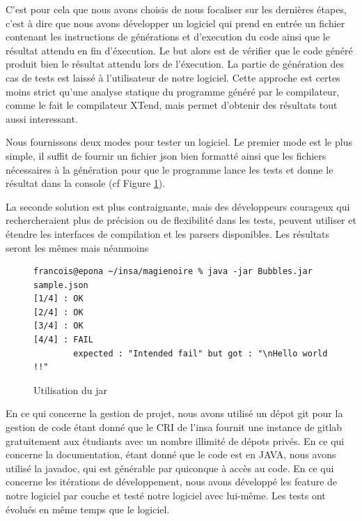 C'est pour cela que nous avons choisis de nous focaliser sur les dernières étapes, c'est à dire que
nous avons développer un logiciel qui prend en entrée un fichier contenant les instructions de générations et d'execution du code ainsi que le résultat
attendu en fin d'éxecution. Le but alors est de vérifier que le code généré produit bien le résultat attendu lors de l'éxecution. La partie de génération
des cas de tests est laissé à l'utilisateur de notre logiciel. Cette approche est certes moins strict qu'une analyse statique du programme généré par
le compilateur, comme le fait le compilateur XTend, mais permet d'obtenir des résultats tout aussi interessant.

Nous fournissons deux modes pour tester un logiciel. Le premier mode est le plus simple, il suffit de fournir un fichier json bien formatté
ainsi que les fichiers nécessaires à la génération pour que le programme lance les tests et donne le résultat dans la console (cf Figure \ref{mode1}).

La seconde solution est plus contraignante, mais des développeurs courageux qui rechercheraient plus de précision ou de flexibilité dans les tests,
peuvent utiliser et étendre les interfaces de compilation et les parsers disponibles. Les résultats seront les mêmes mais néanmoins

\begin{figure}
\begin{lstlisting}
francois@epona ~/insa/magienoire % java -jar Bubbles.jar sample.json
[1/4] : OK
[2/4] : OK
[3/4] : OK
[4/4] : FAIL
        expected : "Intended fail" but got : "\nHello world !!"
\end{lstlisting}
\caption{Utilisation du jar}
\label{mode1}
\end{figure}


En ce qui concerne la gestion de projet, nous avons utilisé un dépot git pour la gestion de code étant donné que le CRI de l'insa fournit une
instance de gitlab gratuitement aux étudiants avec un nombre illimité de dépots privés. En ce qui concerne la documentation, étant donné que le code
est en JAVA, nous avons utilisé la javadoc, qui est générable par quiconque à accès au code. En ce qui concerne les itérations de développement,
nous avons développé les feature de notre logiciel par couche et testé notre logiciel avec lui-même. Les tests ont évolués en même temps que le logiciel.
